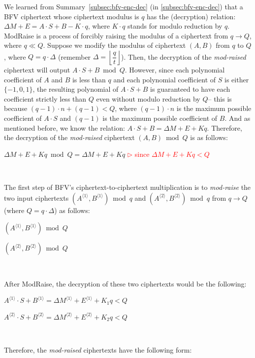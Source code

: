 We learned from Summary~\ref*{subsec:bfv-enc-dec} (in \autoref{subsec:bfv-enc-dec}) that a BFV ciphertext whose ciphertext modulus is $q$ has the (decryption) relation: $\Delta M + E = A\cdot S + B - K \cdot q$, where $K \cdot q$ stands for modulo reduction by $q$. \textsf{ModRaise} is a process of forcibly raising the modulus of a ciphertext from $q \rightarrow Q$, where $q \ll Q$. Suppose we modify the modulus of ciphertext $(A, B)$ from $q$ to $Q$, where $Q = q \cdot \Delta$ (remember $\Delta = \left\lfloor\dfrac{q}{t}\right\rfloor$). Then, the decryption of the \textit{mod-raised} ciphertext will output $A\cdot S + B \bmod Q$. However, since each polynomial coefficient of $A$ and $B$ is less than $q$ and each polynomial coefficient of $S$ is either $\{-1, 0, 1\}$, the resulting polynomial of $A\cdot S + B$ is guaranteed to have each coefficient strictly less than $Q$ even without modulo reduction by $Q$-- this is because $(q-1)\cdot n + (q-1) < Q$, where $(q-1)\cdot n$ is the maximum possible coefficient of $A \cdot S$ and $(q-1)$ is the maximum possible coefficient of $B$. And as mentioned before, we know the relation: $A\cdot S + B = \Delta M + E + Kq$. Therefore, the decryption of the \textit{mod-raised} ciphertext $(A, B) \bmod Q$ is as follows:

$\Delta M + E + Kq \bmod Q = \Delta M + E + Kq$ \textcolor{red}{ $\rhd$  since $\Delta M + E + Kq < Q$} 

$ $

The first step of BFV's ciphertext-to-ciphertext multiplication is to \textit{mod-raise} the two input ciphertexts $(A^{\langle 1 \rangle}, B^{\langle 1 \rangle}) \bmod q$ and $(A^{\langle 2 \rangle}, B^{\langle 2 \rangle}) \bmod q$  
from $q \rightarrow Q$ (where $Q = q\cdot \Delta$) as follows: 

$(A^{\langle 1 \rangle}, B^{\langle 1 \rangle}) \bmod Q$

$(A^{\langle 2 \rangle}, B^{\langle 2 \rangle}) \bmod Q$

$ $

After \textsf{ModRaise}, the decryption of these two ciphertexts would be the following: 

$A^{\langle 1 \rangle} \cdot S + B^{\langle 1 \rangle} = \Delta M^{\langle 1 \rangle} + E^{\langle 1 \rangle} + K_1q < Q$

$A^{\langle 2 \rangle} \cdot S + B^{\langle 2 \rangle} = \Delta M^{\langle 2 \rangle} + E^{\langle 2 \rangle} + K_2q < Q$


$ $

Therefore, the \textit{mod-raised} ciphertexts have the following form: 

